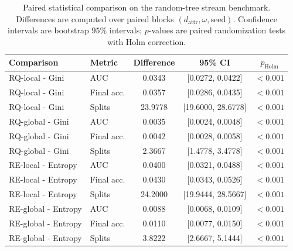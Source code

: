 \begin{table}[t]
\centering
\caption{Paired statistical comparison on the random-tree stream benchmark. Differences are computed over paired blocks $(d_{\mathrm{attr}},\omega,\mathrm{seed})$. Confidence intervals are bootstrap $95\%$ intervals; $p$-values are paired randomization tests with Holm correction.}
\label{tab:random_tree_statistical_comparison}
\begin{tabular}{llccc}
\hline
Comparison & Metric & Difference & 95\% CI & $p_{\mathrm{Holm}}$ \\
\hline
RQ-local - Gini & AUC & 0.0343 & [0.0272, 0.0422] & $<0.001$ \\
RQ-local - Gini & Final acc. & 0.0357 & [0.0286, 0.0435] & $<0.001$ \\
RQ-local - Gini & Splits & 23.9778 & [19.6000, 28.6778] & $<0.001$ \\
RQ-global - Gini & AUC & 0.0035 & [0.0024, 0.0048] & $<0.001$ \\
RQ-global - Gini & Final acc. & 0.0042 & [0.0028, 0.0058] & $<0.001$ \\
RQ-global - Gini & Splits & 2.3667 & [1.4778, 3.4778] & $<0.001$ \\
RE-local - Entropy & AUC & 0.0400 & [0.0321, 0.0488] & $<0.001$ \\
RE-local - Entropy & Final acc. & 0.0430 & [0.0343, 0.0526] & $<0.001$ \\
RE-local - Entropy & Splits & 24.2000 & [19.9444, 28.5667] & $<0.001$ \\
RE-global - Entropy & AUC & 0.0088 & [0.0068, 0.0109] & $<0.001$ \\
RE-global - Entropy & Final acc. & 0.0110 & [0.0077, 0.0150] & $<0.001$ \\
RE-global - Entropy & Splits & 3.8222 & [2.6667, 5.1444] & $<0.001$ \\
\hline
\end{tabular}
\end{table}

